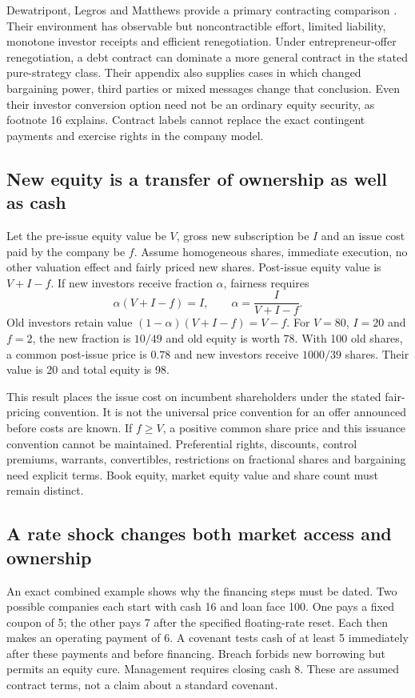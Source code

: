 \documentclass[11pt,a4paper]{article}
\begin{document}
Dewatripont, Legros and Matthews provide a primary contracting comparison
\cite[Sections~2--6 and Appendix~B]{dewat}. Their environment has observable
but noncontractible effort, limited liability, monotone investor receipts and
efficient renegotiation. Under entrepreneur-offer renegotiation, a debt
contract can dominate a more general contract in the stated pure-strategy
class. Their appendix also supplies cases in which changed bargaining power,
third parties or mixed messages change that conclusion. Even their investor
conversion option need not be an ordinary equity security, as footnote 16
explains. Contract labels cannot replace the exact contingent payments and
exercise rights in the company model.

\subsection{New equity is a transfer of ownership as well as cash}
Let the pre-issue equity value be $V$, gross new subscription be $I$ and an
issue cost paid by the company be $f$. Assume homogeneous shares, immediate
execution, no other valuation effect and fairly priced new shares. Post-issue
equity value is $V+I-f$. If new investors receive fraction $\alpha$, fairness
requires
\begin{equation}
\alpha(V+I-f)=I,\qquad
\alpha=\frac{I}{V+I-f}.
\end{equation}
Old investors retain value $(1-\alpha)(V+I-f)=V-f$. For $V=80$, $I=20$
and $f=2$, the new fraction is $10/49$ and old equity is worth 78. With
100 old shares, a common post-issue price is $0.78$ and new investors receive
$1000/39$ shares. Their value is 20 and total equity is 98.

This result places the issue cost on incumbent shareholders under the stated
fair-pricing convention. It is not the universal price convention for an
offer announced before costs are known. If $f\geq V$, a positive common
share price and this issuance convention cannot be maintained. Preferential
rights, discounts, control premiums, warrants, convertibles, restrictions on
fractional shares and bargaining need explicit terms. Book equity, market
equity value and share count must remain distinct.

\subsection{A rate shock changes both market access and ownership}
An exact combined example shows why the financing steps must be dated. Two
possible companies each start with cash 16 and loan face 100. One pays a
fixed coupon of 5; the other pays 7 after the specified floating-rate reset.
Each then makes an operating payment of 6. A covenant tests cash of at least
5 immediately after these payments and before financing. Breach forbids new
borrowing but permits an equity cure. Management requires closing cash 8.
These are assumed contract terms, not a claim about a standard covenant.
\end{document}
